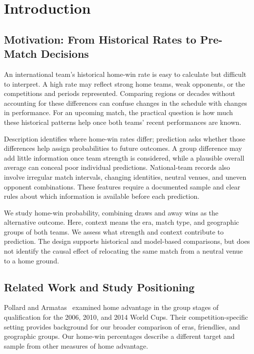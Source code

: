 \section{Introduction}
\subsection{Motivation: From Historical Rates to Pre-Match Decisions}

An international team's historical home-win rate is easy to calculate but difficult to interpret. A high rate may reflect strong home teams, weak opponents, or the competitions and periods represented. Comparing regions or decades without accounting for these differences can confuse changes in the schedule with changes in performance. For an upcoming match, the practical question is how much these historical patterns help once both teams' recent performances are known.

Description identifies where home-win rates differ; prediction asks whether those differences help assign probabilities to future outcomes. A group difference may add little information once team strength is considered, while a plausible overall average can conceal poor individual predictions. National-team records also involve irregular match intervals, changing identities, neutral venues, and uneven opponent combinations. These features require a documented sample and clear rules about which information is available before each prediction.

We study home-win probability, combining draws and away wins as the alternative outcome. Here, context means the era, match type, and geographic groups of both teams. We assess what strength and context contribute to prediction. The design supports historical and model-based comparisons, but does not identify the causal effect of relocating the same match from a neutral venue to a home ground.

\subsection{Related Work and Study Positioning}

Pollard and Armatas~\citep{pollard2017qualification} examined home advantage in the group stages of qualification for the 2006, 2010, and 2014 World Cups. Their competition-specific setting provides background for our broader comparison of eras, friendlies, and geographic groups. Our home-win percentages describe a different target and sample from other measures of home advantage.


